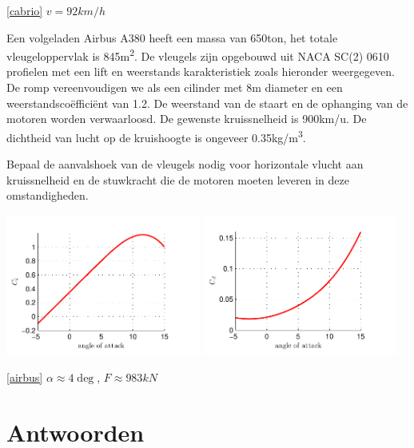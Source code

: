 \begin{antwoord}{\ref{cabrio}}
	$v=92\unit{km/h}$
\end{antwoord}
\begin{toepassing}[*]
	\label{airbus}
Een volgeladen Airbus A380 heeft een massa van 650ton, het totale vleugeloppervlak is 845\unit{m^2}. De vleugels zijn opgebouwd uit NACA SC(2) 0610 profielen met een lift en weerstands karakteristiek zoals hieronder weergegeven. De romp vereenvoudigen we als een cilinder met 8m diameter en een weerstandscoëfficiënt van 1.2. De weerstand van de staart en de ophanging van de motoren worden verwaarloosd. De gewenste kruissnelheid is 900km/u. De dichtheid van lucht op de kruishoogte is ongeveer 0.35\unit{kg/m^3}.
		
Bepaal de aanvalshoek van de vleugels nodig voor horizontale vlucht aan kruissnelheid en de stuwkracht die de motoren moeten leveren in deze omstandigheden.

	\centering
	\includegraphics[width=0.48\textwidth]{fig/uitwendige_stroming/NACA_SC(2)_0610_Cl.pdf}
	\includegraphics[width=0.48\textwidth]{fig/uitwendige_stroming/NACA_SC(2)_0610_Cd.pdf}
\end{toepassing}
\begin{antwoord}{\ref{airbus}}
	$\alpha \approx 4\deg$, $F \approx 983\unit{kN}$
\end{antwoord}


\section*{Antwoorden}
	\begin{multicols}{2}
	\end{multicols}